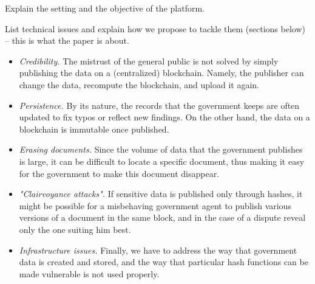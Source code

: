 


Explain the setting and the objective of the platform.

List technical issues and explain how we propose to tackle them (sections below) -- this is what the paper is about.

\begin{itemize}
\item {\it Credibility.} The mistrust of the general public is not solved by simply publishing the data on a (centralized) blockchain. Namely, the publisher can change the data, recompute the blockchain, and upload it again.
\item {\it Persistence.} By its nature, the records that the government keeps are often updated to fix typos or reflect new findings. On the other hand, the data on a blockchain is immutable once published.
\item {\it Erasing documents.} Since the volume of data that the government publishes is large, it can be difficult to locate a specific document, thus making it easy for the government to make this document disappear.
\item {\it "Clairvoyance attacks".} If sensitive data is published only through hashes, it might be possible for a misbehaving government agent to publish various versions of a document in the same block, and in the case of a dispute reveal only the one suiting him best.
\item {\it Infrastructure issues.} Finally, we have to address the way that government data is created and stored, and the way that particular hash functions can be made vulnerable is not used properly. 
\end{itemize}